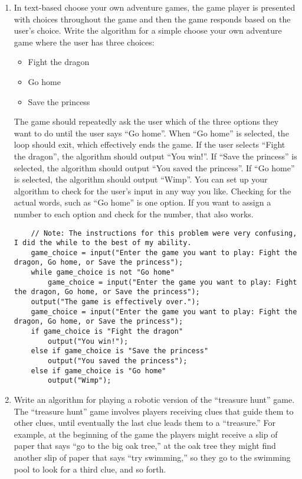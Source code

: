 \documentclass{article}
\begin{document}
\begin{enumerate}
	\item In text­-based choose your own adventure games, the game player is presented with choices throughout the game and then the game responds based on the user’s choice.
Write the algorithm for a simple choose your own adventure game where the user has three choices: \begin{itemize}
	\item Fight the dragon
	\item Go home
	\item Save the princess
\end{itemize}
The game should repeatedly ask the user which of the three options they want to do until the user says “Go home”. When “Go home” is selected, the loop should exit, which effectively ends the game.\newline\newline
If the user selects “Fight the dragon”, the algorithm should output “You win!”. If “Save the princess” is selected, the algorithm should output “You saved the princess”. If “Go home” is selected, the algorithm should output “Wimp”. \newline\newline
You can set up your algorithm to check for the user’s input in any way you like. Checking for the actual words, such as “Go home” is one option. If you want to assign a number to each option and check for the number, that also works.
	
\begin{lstlisting}
	// Note: The instructions for this problem were very confusing, I did the while to the best of my ability.
	game_choice = input("Enter the game you want to play: Fight the dragon, Go home, or Save the princess");
	while game_choice is not "Go home"
		game_choice = input("Enter the game you want to play: Fight the dragon, Go home, or Save the princess");
	output("The game is effectively over.");
	game_choice = input("Enter the game you want to play: Fight the dragon, Go home, or Save the princess");
	if game_choice is "Fight the dragon"
		output("You win!");
	else if game_choice is "Save the princess"
		output("You saved the princess");
	else if game_choice is "Go home"
		output("Wimp");
\end{lstlisting}


	\item Write an algorithm for playing a robotic version of the “treasure hunt” game. The “treasure hunt” game involves players receiving clues that guide them to other clues, until eventually the last clue leads them to a “treasure.” For example, at the beginning of the game the players might receive a slip of paper that says “go to the big oak tree,” at the oak tree they might find another slip of paper that says “try swimming,” so they go to the swimming pool to look for a third clue, and so forth.\newline
		

\end{enumerate}
\end{document}
